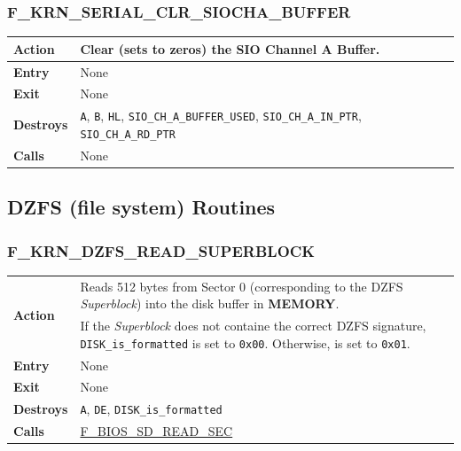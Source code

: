 \documentclass[a4paper,11pt]{article}
\begin{document}
        \subsubsection{F\_KRN\_SERIAL\_CLR\_SIOCHA\_BUFFER}
        \label{func:fkrnserialclrsiochabuffer}
        \begin{tabular}{l p{9cm}}
            \hline\textbf{Action}
            & Clear (sets to zeros) the SIO Channel A Buffer. \\
            \hline\textbf{Entry} & None\\
            \hline\textbf{Exit} & None \\
            \hline\textbf{Destroys} & \texttt{A}, \texttt{B}, \texttt{HL},
            \texttt{SIO\_CH\_A\_BUFFER\_USED}, \texttt{SIO\_CH\_A\_IN\_PTR},
            \texttt{SIO\_CH\_A\_RD\_PTR}\\
            \hline\textbf{Calls} & None\\
            \hline
        \end{tabular}

    \subsection{DZFS (file system) Routines}

        \subsubsection{F\_KRN\_DZFS\_READ\_SUPERBLOCK}
        \label{func:fkrndzfsreadsuperblock}
        \begin{tabular}{l p{9cm}}
            \hline\multirow[t]{2}{4em}{\textbf{Action}}
            & Reads 512 bytes from Sector 0 (corresponding to the DZFS 
            \textit{Superblock}) into the disk buffer in \textbf{MEMORY}.\\
            & If the \textit{Superblock} does not containe the correct DZFS
            signature, \texttt{DISK\_is\_formatted} is set to \texttt{0x00}. Otherwise, is
            set to \texttt{0x01}.\\
            \hline\textbf{Entry} & None \\
            \hline\textbf{Exit} & None \\
            \hline\textbf{Destroys} & \texttt{A}, \texttt{DE},
            \texttt{DISK\_is\_formatted} \\
            \hline\textbf{Calls}
            & \hyperref[func:fbiosdiskreadsec]{F\_BIOS\_SD\_READ\_SEC}\\
            \hline
        \end{tabular}
\end{document}
